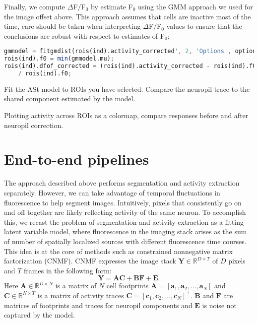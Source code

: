 \documentclass[a4paper]{report}
\newcommand{\nexercise}[0]{\arabic{exercises}\addtocounter{exercises}{1}}
\begin{document}
Finally, we compute $\Delta$F/F$_0$ by estimate F$_0$ using the GMM approach we used for the image offset above. This approach assumes that cells are inactive most of the time, care should be taken when interpreting $\Delta$F/F$_0$ values to ensure that the conclusions are robust with respect to estimates of F$_0$:
\begin{lstlisting}[language=Octave]
gmmodel = fitgmdist(rois(ind).activity_corrected', 2, 'Options', options);
rois(ind).f0 = min(gmmodel.mu);
rois(ind).dfof_corrected = (rois(ind).activity_corrected - rois(ind).f0) ...
    / rois(ind).f0;  
\end{lstlisting}

\begin{exercisebox}[frametitle={Exercise \nexercise: Neuropil correction}]
Fit the ASt model to ROIs you have selected.
Compare the neuropil trace to the shared component estimated by the model.

Plotting activity across ROIs as a colormap, compare responses before and after neuropil correction.
\end{exercisebox}

\section{End-to-end pipelines}
The approach described above performs segmentation and activity extraction separately. 
However, we can take advantage of temporal fluctuations in fluorescence to help segment images. 
Intuitively, pixels that consistently go on and off together are likely reflecting activity of the same neuron. 
To accomplish this, we recast the problem of segmentation and activity extraction as a fitting latent variable model, where fluorescence in the imaging stack arises as the sum of number of spatially localized sources with different fluorescence time courses.
This idea is at the core of methods such as constrained nonnegative matrix factorization (CNMF).
CNMF expresses the image stack $\mathbf{Y} \in \mathbb { R } ^ { D \times T }$ of $D$ pixels and $T$ frames in the following form:
\begin{equation}
	\mathbf{Y} = \mathbf{AC} + \mathbf{BF} + \mathbf{E}.
	\label{eq:cnmf}
\end{equation}
Here $\mathbf{A} \in \mathbb { R } ^ { D \times N }$ is a matrix of $N$ cell footprints $\mathbf{A} = [ \mathbf { a } _ { 1 } , \mathbf { a } _ { 2 } , \ldots , \mathbf { a } _ { N } ]$ and $\mathbf{C} \in \mathbb { R } ^ { N \times T }$ is a matrix of activity traces $\mathbf{C} = [ \mathbf { c } _ { 1 } , \mathbf { c } _ { 2 } , \ldots , \mathbf { c } _ { N } ] ^ { \top }$. 
$\mathbf{B}$ and $\mathbf{F}$ are matrices of footprints and traces for neuropil components and $\mathbf{E}$ is noise not captured by the model.
\end{document}
